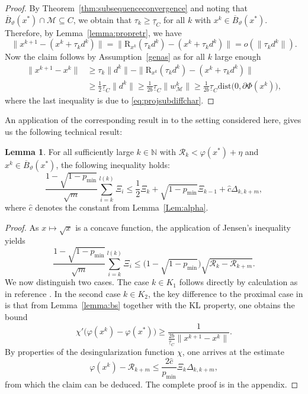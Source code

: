 \documentclass[a4paper, 12pt]{article}
\numberwithin{equation}{section}
\theoremstyle{bolddef}
\theoremstyle{definition}
\theoremstyle{boldplain}
\newtheorem{lemma}[definition]{Lemma}
\newcommand{\xk}{x^k}
\newcommand{\wk}{w^k}
\newcommand{\dk}{d^k}
\newcommand{\tauk}{\tau_k}
\newcommand{\xkp}{x^{k+1}}
\newcommand{\pmin}{p_{\min}}
\newcommand{\taug}{\underline{\tau}}
\newcommand{\Rvalue}{\mathcal{R}}
\newcommand{\dist}{\mathrm{dist}}
\newcommand{\clball}{\overline{B}}
\newcommand{\retr}{\mathrm{R}}
\begin{document}
\begin{proof}
By Theorem~\ref{thm:subsequenceconvergence} and noting that $\clball_\vartheta(x^*) \cap \mathcal{M} \subseteq C$, we obtain that $\tauk \geq \taug_C$ for all $k$ with $\xk \in \clball_\vartheta(x^*)$. Therefore, by Lemma~\ref{lemma:propretr}, we have
\begin{equation*}
	\|\xkp - (\xk + \tauk \dk)\| = \|\retr_{\xk}(\tauk \dk) - (\xk + \tauk \dk)\| = o(\| \tauk \dk\|).
\end{equation*}
Now the claim follows by Assumption~\ref{genas} as for all $k$ large enough
\begin{align*}
	\| \xkp - \xk \| &\geq \tauk \| \dk \| - \| \retr_{\xk} (\tauk \dk) - (\xk + \tauk \dk)\|\\
		& \geq \frac{1}{2} \taug_C \| \dk \| 
		 \geq \frac{1}{2 b} \taug_C \| \wk_\mathcal{M}\| 
		 \geq \frac{1}{2b} \taug_C \dist\big(0, \partial \Phi(\xk)\big),
\end{align*}
where the last inequality is due to \eqref{eq:projsubdiffchar}.
\end{proof}

An application of the corresponding result in \cite{Qian2024} to the setting considered here, gives us the following technical result:

\begin{lemma}\label{lemma:lemmaxi}
For all sufficiently large $k \in \mathbb{N}$ with $\Rvalue_k < \varphi(x^*) + \eta$ and $\xk \in \clball_\vartheta(x^*)$, the following inequality holds:
\begin{equation}\label{eq:lemmaxi}
	\frac{1-\sqrt{1-p_{\min}}}{\sqrt{m}} \sum_{i = k}^{l(k)} \Xi_i \leq \frac{1}{2} \Xi_k + \sqrt{1-p_{\min}} \Xi_{k-1} + \hat c \Delta_{k, k+m},
\end{equation}
where $\hat c $ denotes the constant from Lemma~\ref{Lem:alpha}.
\end{lemma}

\begin{proof}
As $x \mapsto \sqrt{x}$ is a concave function, the application of Jensen's inequality yields
\begin{equation}\label{eq:inequality}
   \frac{1-\sqrt{1-p_{\min}}}{\sqrt{m}} \sum_{i = k}^{l(k)} \Xi_i \leq \big( 1-\sqrt{1-\pmin} \big) \sqrt{\Rvalue_k - \Rvalue_{k+m}}.
\end{equation}
We now distinguish two cases. The case $k \in K_1$ follows directly by calculation as in reference \cite{Qian2024}. In the second case $k \in K_2$, the key difference to the proximal case in \cite{kanzow2025} is that from Lemma~\ref{lemma:bs} together with the KL property, 
one obtains the bound
\begin{equation*}
	\chi'\big(\varphi(\xk) - \varphi(x^*)\big) \geq \frac{1}{\frac{2 b}{\taug_C} \| \xkp - \xk \|}.
\end{equation*}
By properties of the desingularization function $\chi$, one arrives at the estimate
\begin{equation*}
	\varphi(\xk) - \Rvalue_{k+m} \leq \frac{2 \hat c}{\pmin} \Xi_k \Delta_{k, k+m},
\end{equation*}
from which the claim can be deduced. The complete proof is in the appendix.
\end{proof}
\end{document}
